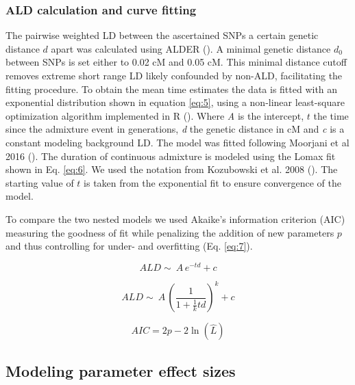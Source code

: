 \documentclass[]{article}
\begin{document}
\subsubsection{ALD calculation and curve fitting}\label{ALD calculation and curve fitting}

The pairwise weighted LD between the ascertained SNPs a certain genetic
distance \(d\) apart was calculated using ALDER
(\cite{loh_inferring_2013}). A minimal genetic distance \(d_0\) between
SNPs is set either to 0.02 cM and 0.05 cM. This minimal distance cutoff
removes extreme short range LD likely confounded by non-ALD,
facilitating the fitting procedure. To obtain the mean time estimates
the data is fitted with an exponential distribution shown in equation
\ref{eq:5}, using a non-linear least-square optimization algorithm
implemented in R (\cite{R_Core_Team_2019}). Where \emph{A} is the
intercept, \(t\) the time since the admixture event in generations,
\emph{d} the genetic distance in cM and \emph{c} is a constant modeling
background LD. The model was fitted following Moorjani et al 2016
(\cite{moorjani_genetic_2016}). The duration of continuous admixture is
modeled using the Lomax fit shown in Eq. \ref{eq:6}. We used the
notation from Kozubowski et al. 2008 (\cite{Kozubowski_Testing_2008}).
The starting value of \(t\) is taken from the exponential fit to ensure
convergence of the model.

To compare the two nested models we used Akaike's information criterion
(AIC) measuring the goodness of fit while penalizing the addition of new
parameters \(p\) and thus controlling for under- and overfitting (Eq.
\ref{eq:7}).

\begin{equation}
\label{eq:5}
ALD \sim\ A\,e^{-td}+c
\end{equation}

\begin{equation}
\label{eq:6}
ALD \sim\ A\,\left( \frac{1}{1 + \frac{1}{k}td}\right) ^k+c
\end{equation}

\begin{equation}
\label{eq:7}
AIC = 2p - 2\ln(\hat{L})
\end{equation}

\subsection{Modeling parameter effect sizes}\label{modeling prameter effect sizes}
\end{document}
